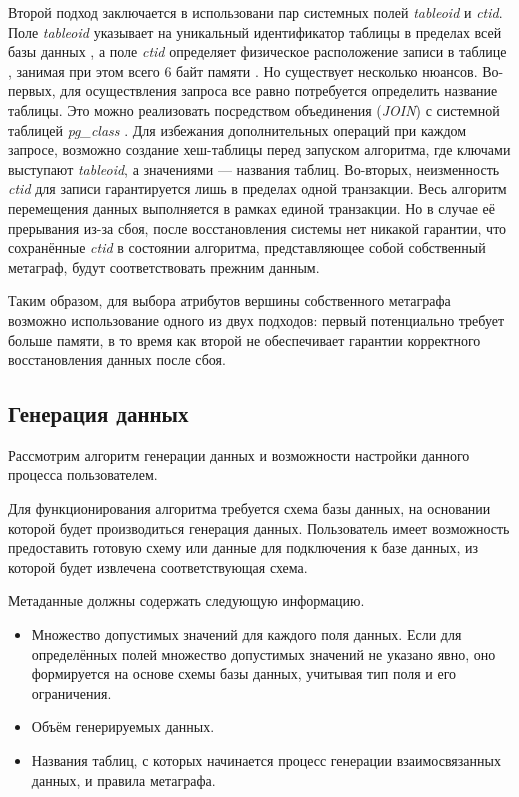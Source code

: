 Второй подход заключается в использовани пар системных полей \textit{tableoid} и \textit{ctid}. Поле \textit{tableoid} указывает на уникальный идентификатор таблицы в пределах всей базы данных \cite{pg-tableoid}, а поле \textit{ctid} определяет физическое расположение записи в таблице \cite{pg-ctid}, занимая при этом всего 6 байт памяти \cite{pg-page-layout}. Но существует несколько нюансов. Во-первых, для осуществления запроса все равно потребуется определить название таблицы. Это можно реализовать посредством объединения (\textit{JOIN}) с системной таблицей \textit{pg\_class} \cite{pg-class}. Для избежания дополнительных операций при каждом запросе, возможно создание хеш-таблицы перед запуском алгоритма, где ключами выступают \textit{tableoid}, а значениями — названия таблиц. Во-вторых, неизменность \textit{ctid} для записи гарантируется лишь в пределах одной транзакции. Весь алгоритм перемещения данных выполняется в рамках единой транзакции. Но в случае её прерывания из-за сбоя, после восстановления системы нет никакой гарантии, что сохранённые \textit{ctid} в состоянии алгоритма, представляющее собой собственный метаграф, будут соответствовать прежним данным.

Таким образом, для выбора атрибутов вершины собственного метаграфа возможно использование одного из двух подходов: первый потенциально требует больше памяти, в то время как второй не обеспечивает гарантии корректного восстановления данных после сбоя.

\subsection{Генерация данных}
Рассмотрим алгоритм генерации данных и возможности настройки данного процесса пользователем.

Для функционирования алгоритма требуется схема базы данных, на основании которой будет производиться генерация данных. Пользователь имеет возможность предоставить готовую схему или данные для подключения к базе данных, из которой будет извлечена соответствующая схема.

Метаданные должны содержать следующую информацию.
\begin{itemize}
  \item Множество допустимых значений для каждого поля данных. Если для определённых полей множество допустимых значений не указано явно, оно формируется на основе схемы базы данных, учитывая тип поля и его ограничения.
  \item Объём генерируемых данных.
  \item Названия таблиц, с которых начинается процесс генерации взаимосвязанных данных, и правила метаграфа.
\end{itemize}

